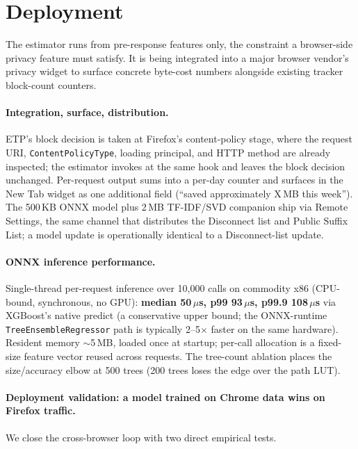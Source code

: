 \documentclass[10pt,sigconf,letterpaper,anonymous]{acmart}
\begin{document}
\section{Deployment}
\label{sec:deployment}

The estimator runs from pre-response features only, the constraint a browser-side privacy feature must satisfy. It is being integrated into a major browser vendor's privacy widget to surface concrete byte-cost numbers alongside existing tracker block-count counters.

\paragraph{Integration, surface, distribution.}
ETP's block decision is taken at Firefox's content-policy stage, where the request URI, \texttt{ContentPolicyType}, loading principal, and HTTP method are already inspected; the estimator invokes at the same hook and leaves the block decision unchanged. Per-request output sums into a per-day counter and surfaces in the New Tab widget as one additional field (``saved approximately X\,MB this week''). The 500\,KB ONNX model plus 2\,MB TF-IDF/SVD companion ship via Remote Settings, the same channel that distributes the Disconnect list and Public Suffix List; a model update is operationally identical to a Disconnect-list update.

\paragraph{ONNX inference performance.}
Single-thread per-request inference over 10{,}000 calls on commodity x86 (CPU-bound, synchronous, no GPU): \textbf{median 50\,$\mu$s, p99 93\,$\mu$s, p99.9 108\,$\mu$s} via XGBoost's native predict (a conservative upper bound; the ONNX-runtime \texttt{TreeEnsembleRegressor} path is typically 2--5$\times$ faster on the same hardware).
Resident memory $\sim$5\,MB, loaded once at startup; per-call allocation is a fixed-size feature vector reused across requests. The tree-count ablation places the size/accuracy elbow at 500 trees (200 trees loses the edge over the path LUT).

\paragraph{Deployment validation: a model trained on Chrome data wins on Firefox traffic.}
We close the cross-browser loop with two direct empirical tests.
\end{document}
